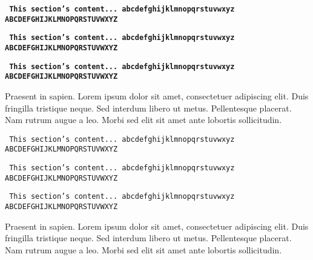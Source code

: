 \clearpage %

\texttt{
\textbf{
\small{This section's content... \newline
abcdefghijklmnopqrstuvwxyz \newline
ABCDEFGHIJKLMNOPQRSTUVWXYZ }}}

\texttt{
\textbf{
\tiny{This section's content... \newline
abcdefghijklmnopqrstuvwxyz \newline
ABCDEFGHIJKLMNOPQRSTUVWXYZ }}}

\texttt{
\textbf{
\normalsize{This section's content... \newline
abcdefghijklmnopqrstuvwxyz \newline
ABCDEFGHIJKLMNOPQRSTUVWXYZ }}}

Praesent in sapien. Lorem ipsum dolor sit amet, consectetuer adipiscing elit.
Duis fringilla tristique neque. Sed interdum libero ut metus. Pellentesque placerat.
Nam rutrum augue a leo. Morbi sed elit sit amet ante lobortis sollicitudin.

\texttt{
\small{This section's content... \newline
abcdefghijklmnopqrstuvwxyz \newline
ABCDEFGHIJKLMNOPQRSTUVWXYZ }}

\texttt{
\tiny{This section's content... \newline
abcdefghijklmnopqrstuvwxyz \newline
ABCDEFGHIJKLMNOPQRSTUVWXYZ }}

\texttt{
\normalsize{This section's content... \newline
abcdefghijklmnopqrstuvwxyz \newline
ABCDEFGHIJKLMNOPQRSTUVWXYZ }}

Praesent in sapien. Lorem ipsum dolor sit amet, consectetuer adipiscing elit.
Duis fringilla tristique neque. Sed interdum libero ut metus. Pellentesque placerat.
Nam rutrum augue a leo. Morbi sed elit sit amet ante lobortis sollicitudin.

\clearpage %

